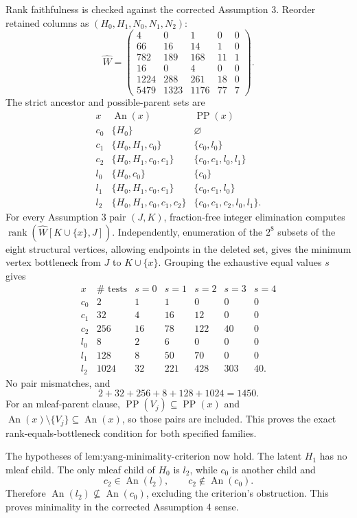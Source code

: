 Rank faithfulness is checked against the corrected Assumption 3. Reorder retained columns as \((H_0,H_1,N_0,N_1,N_2)\):
\[
\widehat W=
\begin{pmatrix}
4&0&1&0&0\\66&16&14&1&0\\782&189&168&11&1\\
16&0&4&0&0\\1224&288&261&18&0\\5479&1323&1176&77&7
\end{pmatrix}.
\]
The strict ancestor and possible-parent sets are
\[
\begin{array}{c|c|c}
x&\operatorname{An}(x)&\operatorname{PP}(x)\\ \hline
c_0&\{H_0\}&\varnothing\\
c_1&\{H_0,H_1,c_0\}&\{c_0,l_0\}\\
c_2&\{H_0,H_1,c_0,c_1\}&\{c_0,c_1,l_0,l_1\}\\
l_0&\{H_0,c_0\}&\{c_0\}\\
l_1&\{H_0,H_1,c_0,c_1\}&\{c_0,c_1,l_0\}\\
l_2&\{H_0,H_1,c_0,c_1,c_2\}&\{c_0,c_1,c_2,l_0,l_1\}.
\end{array}
\]
For every Assumption 3 pair \((J,K)\), fraction-free integer elimination computes \(\operatorname{rank}(\widehat W[K\cup\{x\},J])\). Independently, enumeration of the \(2^8\) subsets of the eight structural vertices, allowing endpoints in the deleted set, gives the minimum vertex bottleneck from \(J\) to \(K\cup\{x\}\). Grouping the exhaustive equal values \(s\) gives
\[
\begin{array}{c|r|rrrrr}
x&\#\text{ tests}&s=0&s=1&s=2&s=3&s=4\\ \hline
c_0&2&1&1&0&0&0\\
c_1&32&4&16&12&0&0\\
c_2&256&16&78&122&40&0\\
l_0&8&2&6&0&0&0\\
l_1&128&8&50&70&0&0\\
l_2&1024&32&221&428&303&40.
\end{array}
\]
No pair mismatches, and
\[
2+32+256+8+128+1024=1450.
\]
For an mleaf-parent clause, \(\operatorname{PP}(V_j)\subseteq\operatorname{PP}(x)\) and \(\operatorname{An}(x)\setminus\{V_j\}\subseteq\operatorname{An}(x)\), so those pairs are included. This proves the exact rank-equals-bottleneck condition for both specified families.

The hypotheses of \(\text{lem:yang-minimality-criterion}\) now hold. The latent \(H_1\) has no mleaf child. The only mleaf child of \(H_0\) is \(l_2\), while \(c_0\) is another child and
\[
c_2\in\operatorname{An}(l_2),\qquad c_2\notin\operatorname{An}(c_0).
\]
Therefore \(\operatorname{An}(l_2)\nsubseteq\operatorname{An}(c_0)\), excluding the criterion's obstruction. This proves minimality in the corrected Assumption 4 sense.

